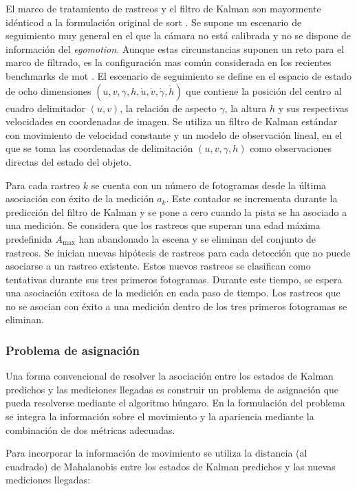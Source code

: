 El marco de tratamiento de rastreos y el filtro de Kalman son mayormente idénticod a la formulación original de \gls{sort} \cite{Bewley_2016}. Se supone un escenario de seguimiento muy general en el que la cámara no está calibrada y no se dispone de información del \textit{egomotion}. Aunque estas circunstancias suponen un reto para el marco de filtrado, es la configuración mas común considerada en los recientes benchmarks de \gls{mot} \cite{milan2016mot16}. El escenario de seguimiento se define en el espacio de estado de ocho dimensiones $(u,v,\gamma,h,\dot{u},\dot{v},\dot{\gamma},\dot{h})$ que contiene la posición del centro al cuadro delimitador $(u,v)$, la relación de aspecto $\gamma$, la altura $h$ y sus respectivas velocidades en coordenadas de imagen. Se utiliza un filtro de Kalman estándar con movimiento de velocidad constante y un modelo de observación lineal, en el que se toma las coordenadas de delimitación $(u,v,\gamma,h)$ como observaciones directas del estado del objeto.

Para cada rastreo $k$ se cuenta con un número de fotogramas desde la última asociación con éxito de la medición $a_{k}$. Este contador se incrementa durante la predicción del filtro de Kalman y se pone a cero cuando la pista se ha asociado a una medición. Se considera que los rastreos que superan una edad máxima predefinida $A_{\text{max}}$ han abandonado la escena y se eliminan del conjunto de rastreos. Se inician nuevas hipótesis de rastreos para cada detección que no puede asociarse a un rastreo existente. Estos nuevos rastreos se clasifican como tentativas durante sus tres primeros fotogramas. Durante este tiempo, se espera una asociación exitosa de la medición en cada paso de tiempo. Los rastreos que no se asocian con éxito a una medición dentro de los tres primeros fotogramas se eliminan.

\subsubsection*{Problema de asignación}
\label{subsubsec:assignment-problem}

Una forma convencional de resolver la asociación entre los estados de Kalman predichos y las mediciones llegadas es construir un problema de asignación que pueda resolverse mediante el algoritmo húngaro. En la formulación del problema se integra la información sobre el movimiento y la apariencia mediante la combinación de dos métricas adecuadas.

Para incorporar la información de movimiento se utiliza la distancia (al cuadrado) de Mahalanobis entre los estados de Kalman predichos y las nuevas mediciones llegadas:

